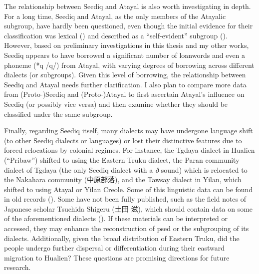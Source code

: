 The relationship between Seediq and Atayal is also worth investigating in depth. For a long time, Seediq and Atayal, as the only members of the Atayalic subgroup, have hardly been questioned, even though the initial evidence for their classification was lexical (\cite{ferrell1969}) and described as a ``self-evident'' subgroup (\cite{blust1999subgrouping}). However, based on preliminary investigations in this thesis and my other works, Seediq appears to have borrowed a significant number of loanwords and even a phoneme (*q /q/) from Atayal, with varying degrees of borrowing across different dialects (or subgroups). Given this level of borrowing, the relationship between Seediq and Atayal needs further clarification. I also plan to compare more data from (Proto-)Seediq and (Proto-)Atayal to first ascertain Atayal's influence on Seediq (or possibly vice versa) and then examine whether they should be classified under the same subgroup.

Finally, regarding Seediq itself, many dialects may have undergone language shift (to other Seediq dialects or languages) or lost their distinctive features due to forced relocations by colonial regimes. For instance, the Tgdaya dialect in Hualien (``Pribaw'') shifted to using the Eastern Truku dialect, the Paran community dialect of Tgdaya (the only Seediq dialect with a \textit{ð} sound) which is relocated to the Nakahara community (中原部落), and the Tawsay dialect in Yilan, which shifted to using Atayal or Yilan Creole. Some of this linguistic data can be found in old records (\cite{tashiro1986easterntw, bullock1874formosan}). Some have not been fully published, such as the field notes of Japanese scholar Tsuchida Shigeru (土田 滋), which should contain data on some of the aforementioned dialects (\cite{li2022tsuchida}). If these materials can be interpreted or accessed, they may enhance the reconstruction of \acl{psed} or the subgrouping of its dialects. Additionally, given the broad distribution of Eastern Truku, did the people undergo further dispersal or differentiation during their eastward migration to Hualien? These questions are promising directions for future research.